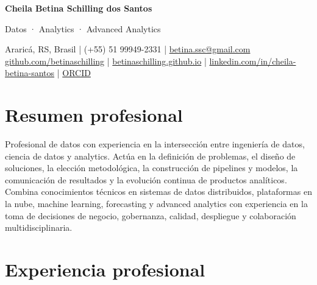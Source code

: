 \documentclass[10pt,a4paper]{article}
\begin{document}
{\sffamily
{\fontsize{24}{27}\selectfont\bfseries Cheila Betina Schilling dos Santos}\par
\vspace{3pt}
{\large\color{red} Datos · Analytics · Advanced Analytics}\par
\vspace{5pt}
{\small
Araricá, RS, Brasil \quad | \quad (+55) 51 99949-2331 \quad | \quad
\href{mailto:betina.ssc@gmail.com}{betina.ssc@gmail.com}\\
\href{https://github.com/betinaschilling}{github.com/betinaschilling} \quad | \quad
\href{https://betinaschilling.github.io/}{betinaschilling.github.io} \quad | \quad
\href{https://www.linkedin.com/in/cheila-betina-santos/}{linkedin.com/in/cheila-betina-santos} \quad | \quad
\href{https://orcid.org/0009-0008-6145-3587}{ORCID}
}\par
}

\section{Resumen profesional}

Profesional de datos con experiencia en la intersección entre ingeniería de datos, ciencia de datos y analytics. Actúa en la definición de problemas, el diseño de soluciones, la elección metodológica, la construcción de pipelines y modelos, la comunicación de resultados y la evolución continua de productos analíticos. Combina conocimientos técnicos en sistemas de datos distribuidos, plataformas en la nube, machine learning, forecasting y advanced analytics con experiencia en la toma de decisiones de negocio, gobernanza, calidad, despliegue y colaboración multidisciplinaria.

\section{Experiencia profesional}
\end{document}
